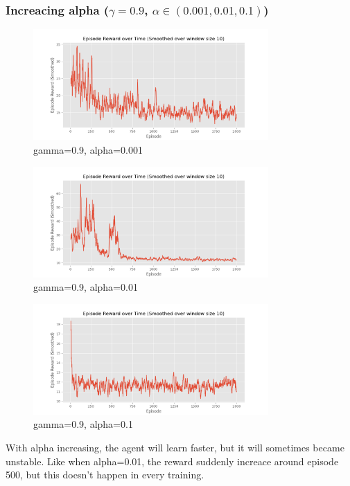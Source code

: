 \documentclass[a4paper]{article}
\theoremstyle{definition}
\newenvironment{soln}{
    \leavevmode\color{blue}\ignorespaces
}{}
\begin{document}
\begin{enumerate}
\begin{soln}
		      \subsubsection*{Increacing alpha ($\gamma =0.9$, $\alpha \in (0.001, 0.01, 0.1)$)}
		      \begin{figure}[H]
			      \centering
			      \includegraphics[width=0.8\textwidth]{img/0.9g0.001a.png}
			      \caption*{gamma=0.9, alpha=0.001}
		      \end{figure}
		      \begin{figure}[H]
			      \centering
			      \includegraphics[width=0.8\textwidth]{img/0.9g0.01a.png}
			      \caption*{gamma=0.9, alpha=0.01}
		      \end{figure}
		      \begin{figure}[H]
			      \centering
			      \includegraphics[width=0.8\textwidth]{img/0.9g0.1a.png}
			      \caption*{gamma=0.9, alpha=0.1}
		      \end{figure}

		      With alpha increasing, the agent will learn faster, but it will sometimes became unstable. Like when alpha=0.01, the reward suddenly increace around episode 500, but this doesn't happen in every training.

	      \end{soln}


\end{enumerate}
\end{document}
